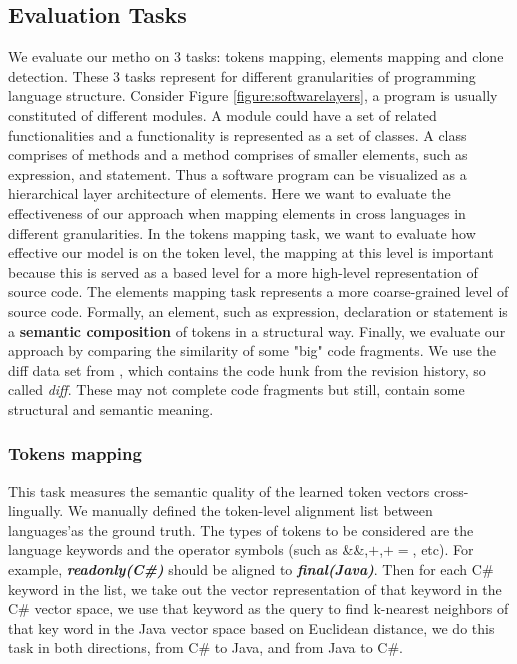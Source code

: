 \subsection{Evaluation Tasks}
We evaluate our metho on 3 tasks: tokens mapping, elements mapping and clone detection. These 3 tasks represent for different granularities of programming language structure. Consider Figure \ref{figure:softwarelayers}, a program is usually constituted of different modules. A module could have a set of related functionalities and a functionality is represented as a set of classes. A class comprises of methods and a method comprises of smaller elements, such as expression, and statement. Thus a software program can be visualized as a hierarchical layer architecture of elements. Here we want to evaluate the effectiveness of our approach when mapping elements in cross languages in different granularities. In the tokens mapping task, we want to evaluate how effective our model is on the token level, the mapping at this level is important because this is served as a based level for a more high-level representation of source code. The elements mapping task represents a more coarse-grained level of source code. Formally, an element, such as expression, declaration or statement is a \textbf{semantic composition} of tokens in a structural way. Finally, we evaluate our approach by comparing the similarity of some "big" code fragments. We use the diff data set from \cite{cheng2017clcminer}, which contains the code hunk from the revision history, so called \textit{diff}. These may not complete code fragments but still, contain some structural and semantic meaning.
\subsubsection{Tokens mapping}
This task measures the semantic quality of the learned token vectors cross-lingually.  We manually defined the token-level alignment list between languages'as the ground truth. The types of tokens to be considered are the language keywords and the operator symbols (such as \&\&,$+$,$+=$, etc). For example, \textbf{\textit{readonly(C\#)}} should be aligned to \textbf{\textit{final(Java)}}. Then for each C\# keyword in the list, we take out the vector representation of that keyword in the C\# vector space, we use that keyword as the query to find k-nearest neighbors of that key word in the Java vector space based on Euclidean distance, we do this task in both directions, from C\# to Java, and from Java to C\#. 

